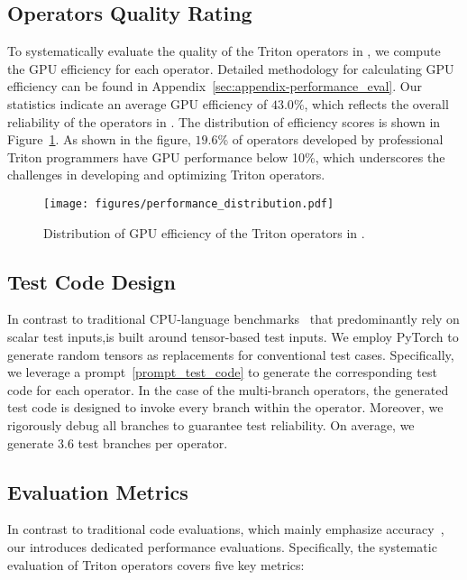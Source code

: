 \subsection{Operators Quality Rating}
\label{sec:benchone-qualityrating}
To systematically evaluate the quality of the Triton operators in \benchone, we compute the GPU efficiency for each operator. 
Detailed methodology for calculating GPU efficiency can be found in Appendix~\ref{sec:appendix-performance_eval}.
Our statistics indicate an average GPU efficiency of $\mathbf{43.0}\%$, which reflects the overall reliability of the operators in \benchone. 
The distribution of efficiency scores is shown in Figure~\ref{fig:performance_distribution}. 
As shown in the figure, $19.6$\% of operators developed by professional Triton programmers have GPU performance below 10\%, which underscores the challenges in developing and optimizing Triton operators.



\begin{figure}[t!]
    \centering
    \texttt{[image: figures/performance\_distribution.pdf]}
    \caption{Distribution of GPU efficiency of the Triton operators in \benchone.}
    \label{fig:performance_distribution}
\end{figure}


\subsection{Test Code Design}
\label{sec:benchone-testcodedesign}
In contrast to traditional CPU-language benchmarks~\cite{shypulalearning,evalplus,huang2024effibench,qiu2024efficient} that predominantly rely on scalar test inputs,\benchone is built around tensor-based test inputs. 
We employ PyTorch to generate random tensors as replacements for conventional test cases. 
Specifically, we leverage a prompt~\ref{prompt_test_code} to generate the corresponding test code for each operator. 
In the case of the multi-branch operators, the generated test code is designed to invoke every branch within the operator. 
Moreover, we rigorously debug all branches to guarantee test reliability. 
On average, we generate $3.6$ test branches per operator.



\subsection{Evaluation Metrics}
\label{sec:benchone-evalmetric}
In contrast to traditional code evaluations, which mainly emphasize accuracy~\cite{chen2021evaluating,austin2021program}, our \benchone introduces dedicated performance evaluations. Specifically, the systematic evaluation of Triton operators covers five key metrics:

